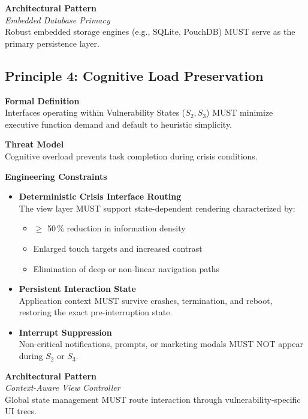 \documentclass[12pt]{article}
\begin{document}
\textbf{Architectural Pattern}\\
\emph{Embedded Database Primacy}\\
Robust embedded storage engines (e.g., SQLite, PouchDB) MUST serve as the primary persistence layer.

\subsection{Principle 4: Cognitive Load Preservation}

\textbf{Formal Definition}\\
Interfaces operating within Vulnerability States ($S_2, S_3$) MUST minimize executive function demand and default to heuristic simplicity.

\textbf{Threat Model}\\
Cognitive overload prevents task completion during crisis conditions.

\textbf{Engineering Constraints}
\begin{itemize}
\item \textbf{Deterministic Crisis Interface Routing}\\
  The view layer MUST support state-dependent rendering characterized by:
  \begin{itemize}
  \item $\ge$ 50\,\% reduction in information density
  \item Enlarged touch targets and increased contrast
  \item Elimination of deep or non-linear navigation paths
  \end{itemize}
\item \textbf{Persistent Interaction State}\\
  Application context MUST survive crashes, termination, and reboot,
  restoring the exact pre-interruption state.
\item \textbf{Interrupt Suppression}\\
  Non-critical notifications, prompts, or marketing modals MUST NOT appear during $S_2$ or $S_3$.
\end{itemize}

\textbf{Architectural Pattern}\\
\emph{Context-Aware View Controller}\\
Global state management MUST route interaction through vulnerability-specific UI trees.

\end{document}
